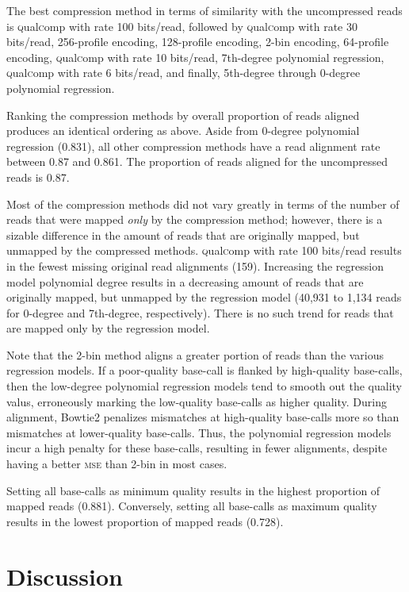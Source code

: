 \documentclass{bioinfo}
\begin{document}
The best compression method in terms of similarity with the
uncompressed reads is \textsc{q}ual\textsc{c}omp with rate 100
bits/read, followed by \textsc{q}ual\textsc{c}omp with rate 30
bits/read, 256-profile encoding, 128-profile encoding, 2-bin encoding,
64-profile encoding, \textsc{q}ual\textsc{c}omp with rate 10
bits/read, 7th-degree polynomial regression,
\textsc{q}ual\textsc{c}omp with rate 6 bits/read, and finally,
5th-degree through 0-degree polynomial regression.

Ranking the compression methods by overall proportion of reads aligned
produces an identical ordering as above. Aside from 0-degree
polynomial regression (0.831), all other compression methods have a
read alignment rate between 0.87 and 0.861. The proportion of reads
aligned for the uncompressed reads is 0.87.

Most of the compression methods did not vary greatly in terms of the
number of reads that were mapped \emph{only} by the compression
method; however, there is a sizable difference in the amount of reads
that are originally mapped, but unmapped by the compressed methods.
\textsc{q}ual\textsc{c}omp with rate 100 bits/read results in the
fewest missing original read alignments (159). Increasing the
regression model polynomial degree results in a decreasing amount of
reads that are originally mapped, but unmapped by the regression model
(40,931 to 1,134 reads for 0-degree and 7th-degree,
respectively). There is no such trend for reads that are mapped only
by the regression model.

Note that the 2-bin method aligns a greater portion of reads than the
various regression models. If a poor-quality base-call is flanked by
high-quality base-calls, then the low-degree polynomial regression
models tend to smooth out the quality valus, erroneously marking the
low-quality base-calls as higher quality.  During alignment, Bowtie2
penalizes mismatches at high-quality base-calls more so than
mismatches at lower-quality base-calls. Thus, the polynomial
regression models incur a high penalty for these base-calls, resulting
in fewer alignments, despite having a better \textsc{mse} than 2-bin
in most cases.

Setting all base-calls as minimum quality results in the highest
proportion of mapped reads (0.881). Conversely, setting all base-calls
as maximum quality results in the lowest proportion of mapped reads
(0.728).

\section{Discussion}
\end{document}
